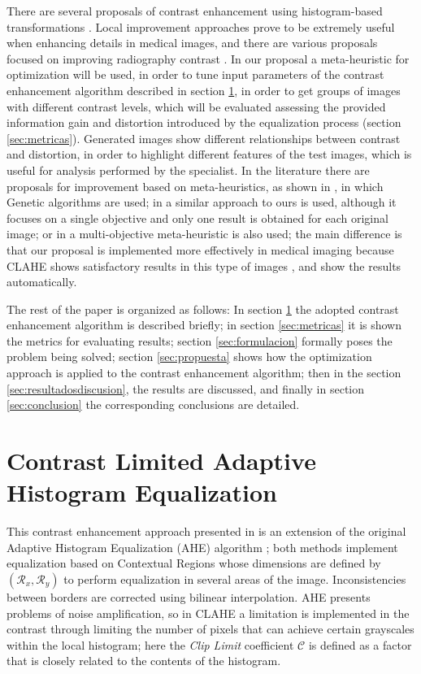 \documentclass[spanish,twocolumn]{article}
\begin{document}
There are several proposals of contrast enhancement using histogram-based transformations \cite{1658094}. Local improvement approaches prove to be extremely useful when enhancing details in medical images, and there are various proposals focused on improving radiography contrast \cite{1625082,4712472,5360176}. In our proposal a meta-heuristic for optimization will be used, in order to tune input parameters of the contrast enhancement algorithm described in section \ref{sec:clahe}, in order to get groups of images with different contrast levels, which will be evaluated assessing the provided information gain and distortion introduced by the equalization process (section \ref{sec:metricas}). Generated images show different relationships between contrast and distortion, in order to highlight different features of the test images, which is useful for analysis performed by the specialist. In the literature there are proposals for improvement based on meta-heuristics, as shown in \cite{Hashemi20101816}, in which Genetic algorithms are used; in \cite{morebrizuela2014} a similar approach to ours is used, although it focuses on a single objective and only one result is obtained for each original image; or in \cite{Shanmugavadivu2014243} a multi-objective meta-heuristic is also used; the main difference is that our proposal is implemented more effectively in medical imaging because CLAHE shows satisfactory results in this type of images \cite{reza2004,5360176}, and show the results automatically.

The rest of the paper is organized as follows: In section \ref{sec:clahe} the adopted contrast enhancement algorithm is described briefly; in section \ref{sec:metricas} it is shown the metrics for evaluating results; section \ref{sec:formulacion} formally poses the problem being solved; section \ref{sec:propuesta} shows how the optimization approach is applied to the contrast enhancement algorithm; then in the section \ref{sec:resultadosdiscusion}, the results are discussed, and finally in section \ref{sec:conclusion} the corresponding conclusions are detailed.


\section{Contrast Limited Adaptive Histogram Equalization}
\label{sec:clahe}

This contrast enhancement approach presented in \cite{Zuiderveld:1994:CLA:180895.180940} is an extension of the original Adaptive Histogram Equalization (AHE) algorithm \cite{pizer1987adaptive}; both methods implement equalization based on Contextual Regions whose dimensions are defined by $(\mathcal{R}_x, \mathcal{R}_y)$ to perform equalization in several areas of the image. Inconsistencies between borders are corrected using bilinear interpolation. AHE presents problems of noise amplification, so in CLAHE a limitation is implemented in the contrast through limiting the number of pixels that can achieve certain grayscales within the local histogram; here the {\it Clip Limit} coefficient $\mathcal{C}$ is defined as a factor that is closely related to the contents of the histogram.
\end{document}
